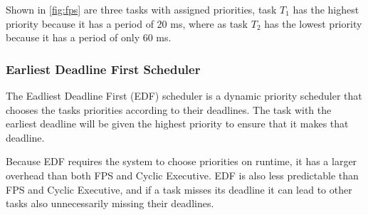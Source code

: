 Shown in \autoref{fig:fps} are three tasks with assigned priorities, task $T_1$ has the highest priority because it has a period of 20 ms, where as task $T_2$ has the lowest priority because it has a period of only 60 ms.

\subsubsection{Earliest Deadline First Scheduler}
The Eadliest Deadline First (EDF) scheduler is a dynamic priority scheduler that chooses the tasks priorities according to their deadlines. The task with the earliest deadline will be given the highest priority to ensure that it makes that deadline.

Because EDF requires the system to choose priorities on runtime, it has a larger overhead than both FPS and Cyclic Executive. EDF is also less predictable than FPS and Cyclic Executive, and if a task misses its deadline it can lead to other tasks also unnecessarily missing their deadlines.